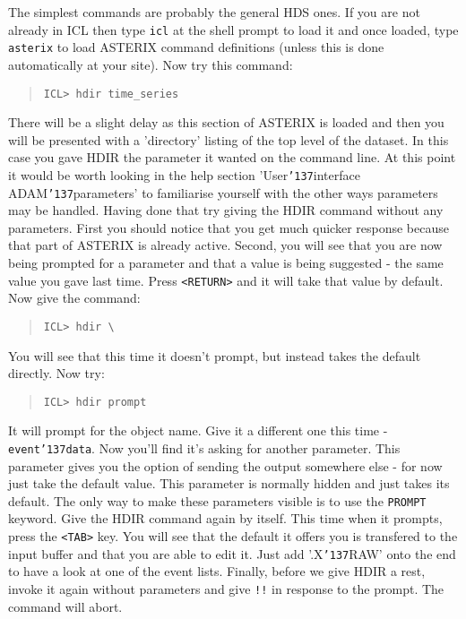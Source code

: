 \documentclass{book}
\renewcommand{\_}{{\tt\char'137}}     %
\begin{document}
The simplest commands are probably the general HDS ones. If you are
not already in ICL then type {\tt icl} at the shell prompt to load it
and once loaded, type
{\tt asterix} to load ASTERIX command definitions (unless this is done
automatically at your site). Now try this command:

\begin{quote}\begin{verbatim}
ICL> hdir time_series
\end{verbatim}\end{quote}
There will be a slight delay as this section of ASTERIX is loaded and
then you will be presented with a 'directory' listing of the top level
of the dataset. In this case you gave HDIR the parameter it wanted on
the command line. At this point it would be worth looking in the help
section 'User\_interface ADAM\_parameters' to familiarise yourself with
the other ways parameters may be handled. Having done that try giving
the HDIR command without any parameters. First you should notice that
you get much quicker response because that part of ASTERIX is already
active. Second, you will see that you are now being prompted for a
parameter and that a value is being suggested - the same value you
gave last time. Press \verb+<RETURN>+ and it will take that value by default.
Now give the command:

\begin{quote}\begin{verbatim}
ICL> hdir \
\end{verbatim}\end{quote}
You will see that this time it doesn't prompt, but instead takes the
default directly. Now try:

\begin{quote}\begin{verbatim}
ICL> hdir prompt
\end{verbatim}\end{quote}
It will prompt for the object name. Give it a different one this time -
{\tt event\_data}. Now you'll find it's asking for another parameter. This
parameter gives you the option of sending the output somewhere else -
for now just take the default value. This parameter is normally hidden
and just takes its default. The only way to make these parameters
visible is to use the {\tt PROMPT} keyword. Give the HDIR command again by
itself. This time when it prompts, press the \verb+<TAB>+ key. You will see
that the default it offers you is transfered to the input buffer and
that you are able to edit it. Just add '.X\_RAW' onto the end to have
a look at one of the event lists. Finally, before we give HDIR a rest,
invoke it again without parameters and give {\tt !!} in response to the
prompt. The command will abort.
\end{document}
